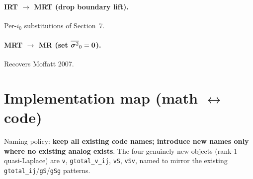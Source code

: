 \documentclass[11pt]{article}
\begin{document}
\paragraph{IRT $\to$ MRT (drop boundary lift).}
Per-$i_0$ substitutions of Section~7.

\paragraph{MRT $\to$ MR (set $\overline{\boldsymbol{\sigma}^2}_0 = \mathbf{0}$).}
Recovers Moffatt 2007.

\section{Implementation map (math $\leftrightarrow$ code)}

Naming policy: \textbf{keep all existing code names; introduce new names
only where no existing analog exists}. The four genuinely new objects
(rank-1 quasi-Laplace) are \texttt{v}, \texttt{gtotal\_v\_ij}, \texttt{vS},
\texttt{vSv}, named to mirror the existing \texttt{gtotal\_ij}/\texttt{gS}/\texttt{gSg}
patterns.
\end{document}
